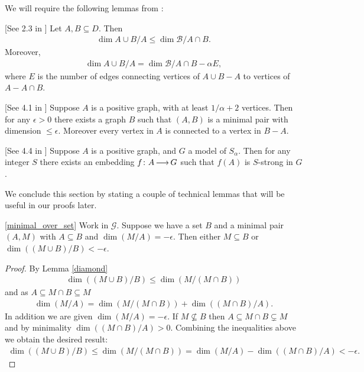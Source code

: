 \documentclass{amsart}
\newcommand{\GG}{\mathcal G}
\newcommand{\B}{\mathcal B}
\begin{document}
We will require the following lemmas from \cite{laskowski}:

\begin{Lemma} \label{diamond} [See 2.3 in \cite{laskowski}]
  Let $A, B \subseteq D$.
  Then
  \begin{align*}
    \dim{A \cup B / A} \leq \dim{\B / A \cap B}.
  \end{align*}
  Moreover, 
  \begin{align*}
    \dim{A \cup B / A} = \dim{\B / A \cap B} - \alpha E,
  \end{align*}
  where $E$ is the number of edges connecting vertices of $A \cup B - A$ to vertices of $A - A \cap B$.
\end{Lemma}

\begin{Lemma} \label{las_min} [See 4.1 in \cite{laskowski}]
  Suppose $A$ is a positive graph, with at least $1/\alpha + 2$ vertices.
  Then for any $\epsilon > 0$ there exists a graph $B$ such that $(A, B)$ is a minimal pair with dimension $\leq \epsilon$.
  Moreover every vertex in $A$ is connected to a vertex in $B - A$.
\end{Lemma}

\begin{Lemma} \label{las_str} [See 4.4 in \cite{laskowski}]
  Suppose $A$ is a positive graph, and $G$ a model of $S_\alpha$.
  Then for any integer $S$ there exists an embedding $f \colon A \operatorname{\longrightarrow} G$ such that $f(A)$ is $S$-strong in $G$.
\end{Lemma}
    
We conclude this section by stating a couple of technical lemmas that will be useful in our proofs later.

\begin{Lemma} \ref{minimal_over_set}
  Work in $\GG$.
  Suppose we have a set $B$ and a minimal pair $(A, M)$ with $A \subseteq B$ and $\dim(M/A) = -\epsilon$.
  Then either $M \subseteq B$ or $\dim((M \cup B)/B) < -\epsilon$.
\end{Lemma}

\begin{proof}
  By Lemma \ref{diamond}
  \begin{align*}
    \dim((M \cup B)/B) \leq \dim(M / (M \cap B))
  \end{align*}
  and as $A \subseteq M \cap B \subseteq M$
  \begin{align*}
    \dim (M/A) = \dim(M / (M \cap B)) + \dim((M \cap B) / A).
  \end{align*}
  In addition we are given $\dim (M/A) = -\epsilon$.
  If $M \not\subseteq B$ then $A \subseteq M \cap B \subsetneq M$ and by minimality $\dim((M \cap B) / A) > 0$.
  Combining the inequalities above we obtain the desired result:
  \begin{align*}
    \dim((M \cup B)/B) \leq \dim(M / (M \cap B)) = \dim (M/A) - \dim((M \cap B) / A) < -\epsilon.
  \end{align*}
\end{proof}
\end{document}
